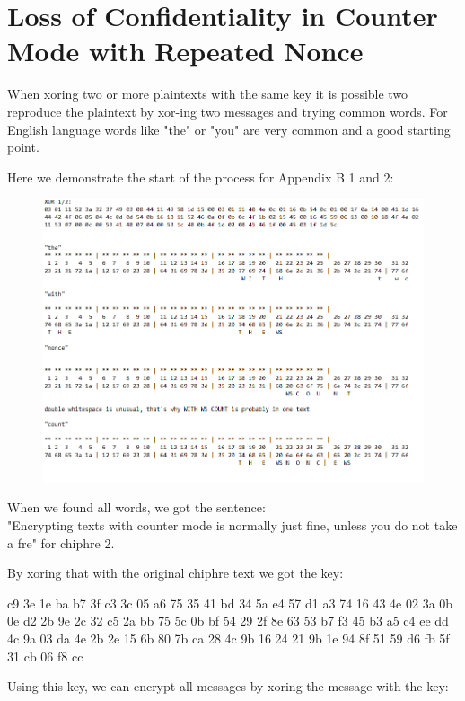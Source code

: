 \section{Loss of Confidentiality in Counter Mode with Repeated Nonce}


When xoring two or more plaintexts with the same key it is possible two reproduce the plaintext by xor-ing two messages and trying common words. For English language words like "the" or "you" are very common and a good starting point.

Here we demonstrate the start of the process for Appendix B 1 and 2:\\

\begin{figure}[H]
	\includegraphics[width=1.0\textwidth]{Assignment0x03/images/xor_1_2}
\end{figure}

When we found all words, we got the sentence:\\
"Encrypting texts with counter mode is normally just fine, unless you do not take a fre" for chiphre 2.

By xoring that with the original chiphre text we got the key:

c9 3e 1e ba b7 3f c3 3c 05 a6 75 35 41 bd 34 5a e4 57 d1 a3 74 16 43 4e 02 3a 0b 0e d2 2b 9e 2c 32 c5 2a bb 75 5c 0b bf 54 29 2f 8e 63 53 b7 f3 45 b3 a5 c4 ee dd 4c 9a 03 da 4e 2b 2e 15 6b 80 7b ca 28 4c 9b 16 24 21 9b 1e 94 8f 51 59 d6 fb 5f 31 cb 06 f8 cc

Using this key, we can encrypt all messages by xoring the message with the key:

